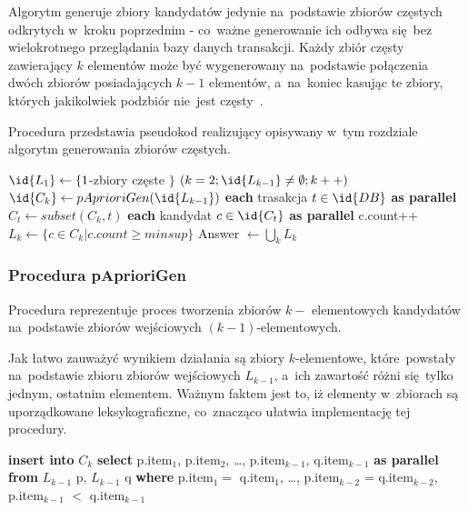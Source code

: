 Algorytm generuje zbiory kandydatów jedynie na~podstawie zbiorów częstych odkrytych w~kroku poprzednim - co~ważne generowanie ich odbywa się~bez wielokrotnego przeglądania bazy danych transakcji. Każdy zbiór częsty zawierający $k$ elementów może być wygenerowany na~podstawie połączenia dwóch zbiorów posiadających $k-1$ elementów, a~na~koniec kasując te zbiory, których jakikolwiek podzbiór nie~jest częsty~\cite{Apriori:Main}.

Procedura  przedstawia pseudokod realizujący opisywany w~tym rozdziale algorytm generowania zbiorów częstych.

\begin{codebox}
	\label{apriori:listing}
	\li $\id{L_1} \gets \lbrace 1$-zbiory częste $\rbrace$
		\li \For $(k = 2; \id{L_{k-1}} \neq \emptyset; k++)$
		\li \Do
			 $\id{C_k} \gets pAprioriGen(\id{L_{k-1}})$
			\li \For \textbf{each} trasakcja $t \in \id{DB}$ \textbf{as parallel}
			\li \Do
					$C_t \gets subset(C_k, t)$
					\li \For \textbf{each} kandydat $c \in \id{C_t}$ \textbf{as parallel}
					\li \Do c.count++
					\End
				\End
			\li $L_k \gets \lbrace c \in C_k | c.count \geq minsup \rbrace$	
		\End
	\li Answer $\gets \bigcup_k L_k $
\end{codebox}

\subsubsection{Procedura pAprioriGen}

Procedura  reprezentuje proces tworzenia zbiorów $k-$ elementowych kandydatów na~podstawie zbiorów wejściowych $(k-1)$-elementowych. 

Jak łatwo zauważyć wynikiem działania  są zbiory $k$-elementowe, które~powstały na~podstawie zbioru zbiorów wejściowych $L_{k-1}$, a~ich zawartość różni się~tylko jednym, ostatnim elementem. Ważnym faktem jest to, iż elementy w~zbiorach są uporządkowane leksykograficzne, co~znacząco ułatwia implementację tej procedury.

\begin{codebox}
	\li \textbf{insert into} $C_k$
	\li \textbf{select} p.item$_1$, p.item$_2$, \dots, p.item$_{k-1}$, q.item$_{k-1}$ \textbf{as parallel}
	\li \textbf{from} $L_{k-1}$ p, $L_{k-1}$ q
	\li \textbf{where} p.item$_1 = $ q.item$_1$, \dots, p.item$_{k-2}$ = q.item$_{k-2}$, p.item$_{k-1}$ $<$ q.item$_{k-1}$
\end{codebox}

